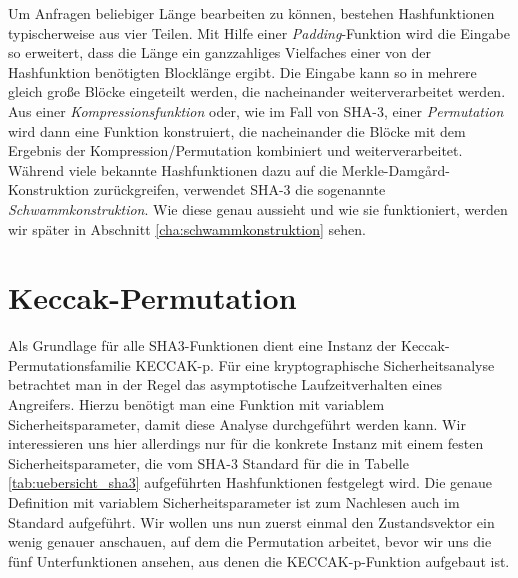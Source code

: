 Um Anfragen beliebiger Länge bearbeiten zu können, bestehen Hashfunktionen typischerweise aus vier Teilen. Mit Hilfe einer \textit{Padding}-Funktion wird die Eingabe so erweitert,
dass die Länge ein ganzzahliges Vielfaches einer von der Hashfunktion benötigten Blocklänge ergibt. Die Eingabe kann so in mehrere gleich große Blöcke eingeteilt werden,
die nacheinander weiterverarbeitet werden. Aus einer \textit{Kompressionsfunktion} oder, wie im Fall von SHA-3, einer \textit{Permutation} wird dann eine Funktion konstruiert,
die nacheinander die Blöcke mit dem Ergebnis der Kompression/Permutation kombiniert und weiterverarbeitet. Während viele bekannte Hashfunktionen dazu auf
die Merkle-Damg\r{a}rd-Konstruktion zurückgreifen, verwendet SHA-3 die sogenannte \textit{Schwammkonstruktion}.
Wie diese genau aussieht und wie sie funktioniert, werden wir später in Abschnitt \ref{cha:schwammkonstruktion} sehen.

\newcommand{\bigcomp}{%
  \DOTSB
  \mathop{\vphantom{\sum}\mathpalette\bigcomp@\relax}%
  \slimits@
}
\newcommand{\bigcomp@}[2]{%
  \begingroup\m@th
  \sbox\z@{$#1\sum$}%
  \setlength{\unitlength}{0.9\dimexpr\ht\z@+\dp\z@}%
  \vcenter{\hbox{%
    \begin{picture}(1,1)
    \bigcomp@linethickness{#1}
    \put(0.5,0.5){\circle{1}}
    \end{picture}%
  }}%
  \endgroup
}
\newcommand{\bigcomp@linethickness}[1]{%
  \linethickness{%
      \ifx#1\displaystyle 2\fontdimen8\textfont\else
      \ifx#1\textstyle 1.65\fontdimen8\textfont\else
      \ifx#1\scriptstyle 1.65\fontdimen8\scriptfont\else
      1.65\fontdimen8\scriptscriptfont\fi\fi\fi 3
  }%
}

\section{Keccak-Permutation}
Als Grundlage für alle SHA3-Funktionen dient eine Instanz der Keccak-Permutationsfamilie KECCAK-p.
Für eine kryptographische Sicherheitsanalyse betrachtet man in der Regel das asymptotische Laufzeitverhalten eines Angreifers.
Hierzu benötigt man eine Funktion mit variablem Sicherheitsparameter, damit diese Analyse durchgeführt werden kann.
Wir interessieren uns hier allerdings nur für die konkrete Instanz mit einem festen Sicherheitsparameter, die vom SHA-3 Standard \cite{sha3-standard}
für die in Tabelle \ref{tab:uebersicht_sha3} aufgeführten Hashfunktionen festgelegt wird.
Die genaue Definition mit variablem Sicherheitsparameter ist zum Nachlesen auch im Standard \cite{sha3-standard} aufgeführt.
Wir wollen uns nun zuerst einmal den Zustandsvektor ein wenig genauer anschauen, auf dem die Permutation arbeitet,
bevor wir uns die fünf Unterfunktionen ansehen, aus denen die KECCAK-p-Funktion aufgebaut ist.

